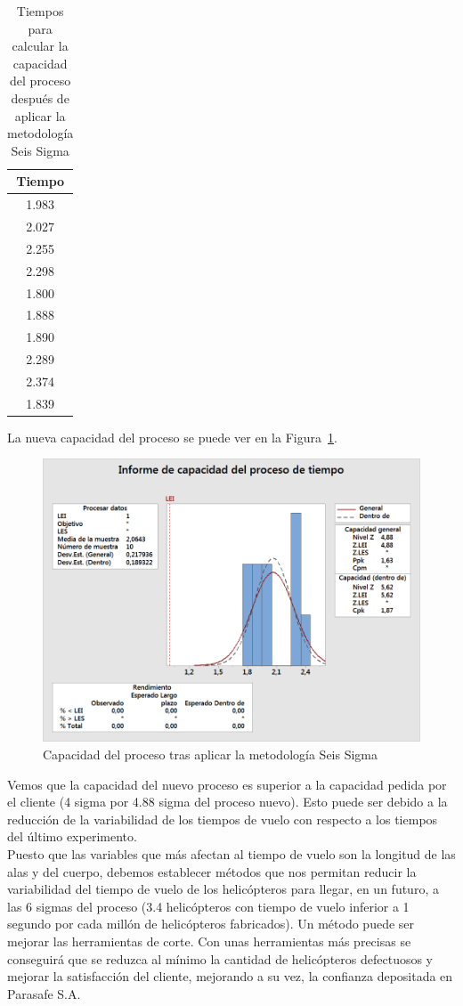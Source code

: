 \documentclass[12pt,a4paper,twoside,openright,titlepage,final]{article}
\begin{document}
\begin{table}[htbp!]
\centering
\caption{Tiempos para calcular la capacidad del proceso después de aplicar la metodología Seis Sigma}
\label{tbl:capcidad_final}
\begin{tabular}{@{}c@{}}
\toprule
Tiempo \\ \midrule
1.983  \\
2.027  \\
2.255  \\
2.298  \\
1.800  \\
1.888  \\
1.890  \\
2.289  \\
2.374  \\
1.839  \\ \bottomrule
\end{tabular}
\end{table}

La nueva capacidad del proceso se puede ver en la Figura~\ref{fig:capacidad_final}.\\

\begin{figure}[htbp!]
	\centering
	\includegraphics[width=0.7\linewidth]{imagenes/Capacidad_final}
	\caption{Capacidad del proceso tras aplicar la metodología Seis Sigma}
	\label{fig:capacidad_final}
\end{figure}

Vemos que la capacidad del nuevo proceso es superior a la capacidad pedida por el cliente (4 sigma por 4.88 sigma del proceso nuevo). Esto puede ser debido a la reducción de la variabilidad de los tiempos de vuelo con respecto a los tiempos del último experimento.\\ 

Puesto que las variables que más afectan al tiempo de vuelo son la longitud de las alas y del cuerpo, debemos establecer métodos que nos permitan reducir la variabilidad del tiempo de vuelo de los helicópteros para llegar, en un futuro, a las 6 sigmas del proceso (3.4 helicópteros con tiempo de vuelo inferior a 1 segundo por cada millón de helicópteros fabricados). Un método puede ser mejorar las herramientas de corte. Con unas herramientas más precisas se conseguirá que se reduzca al mínimo la cantidad de helicópteros defectuosos y mejorar la satisfacción del cliente, mejorando a su vez, la confianza depositada en Parasafe S.A.\\
\end{document}
